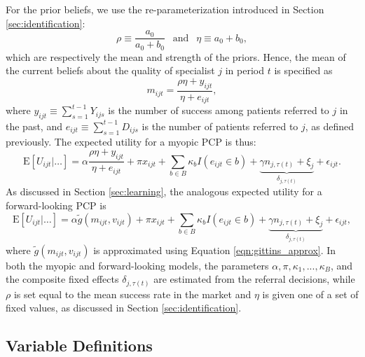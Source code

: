 \documentclass[12pt]{article}
\begin{document}
For the prior beliefs, we use the re-parameterization introduced in Section \ref{sec:identification}:
\begin{equation}
     \rho \equiv \frac{a_0}{a_0 + b_0}
     \ \ \text{ and } \ \ 
     \eta \equiv a_0 + b_0 ,
\end{equation}
which are respectively the mean and strength of the priors. Hence, the mean of the current beliefs about the quality of specialist $j$ in period $t$ is specified as
\begin{equation}
    m_{ijt} = 
    \frac{\rho \eta + y_{ijt}}{\eta + e_{ijt}} ,
\label{eqn:mean_belief}    
\end{equation}
where $y_{ijt} \equiv \sum_{s=1}^{t-1} Y_{ijs}$ is the number of success among patients referred to $j$ in the past, and $e_{ijt} \equiv \sum_{s=1}^{t-1} D_{ijs}$ is the number of patients referred to $j$, as defined previously.
The expected utility for a myopic PCP is thus:
\begin{equation}
    \text{E} \left[ U_{ijt} | \dots \right] =
    \alpha \frac{\rho \eta + y_{ijt}}{\eta + e_{ijt}}
    + \pi x_{ijt} + \sum_{b \in B}\kappa_{b} I(e_{ijt} \in {b}) + \underbrace{\gamma n_{j, \tau(t)} + \xi_{j}}_{\delta_{j, \tau(t)}} + \epsilon_{ijt} .
\label{eqn:myopic_spec}    
\end{equation}
As discussed in Section \ref{sec:learning}, the analogous expected utility for a forward-looking PCP is
\begin{equation}
    \text{E} \left[ U_{ijt} | \dots \right] =
    \alpha \tilde g(m_{ijt},v_{ijt})
    + \pi x_{ijt} + \sum_{b \in B}\kappa_{b} I(e_{ijt} \in {b}) + \underbrace{\gamma n_{j, \tau(t)} + \xi_{j}}_{\delta_{j, \tau(t)}} + \epsilon_{ijt},
\label{eqn:fwd_spec}    
\end{equation}
where $\tilde g(m_{ijt},v_{ijt})$ is approximated using Equation \eqref{eqn:gittins_approx}. In both the myopic and forward-looking models, the parameters $\alpha, \pi, \kappa_{1},...,\kappa_{B}$, and the composite fixed effects $\delta_{j, \tau(t)}$ are estimated from the referral decisions, while $\rho$ is set equal to the mean success rate in the market and $\eta$ is given one of a set of fixed values, as discussed in Section \ref{sec:identification}. 


\subsection{Variable Definitions}
\label{sec:variables}
\end{document}
